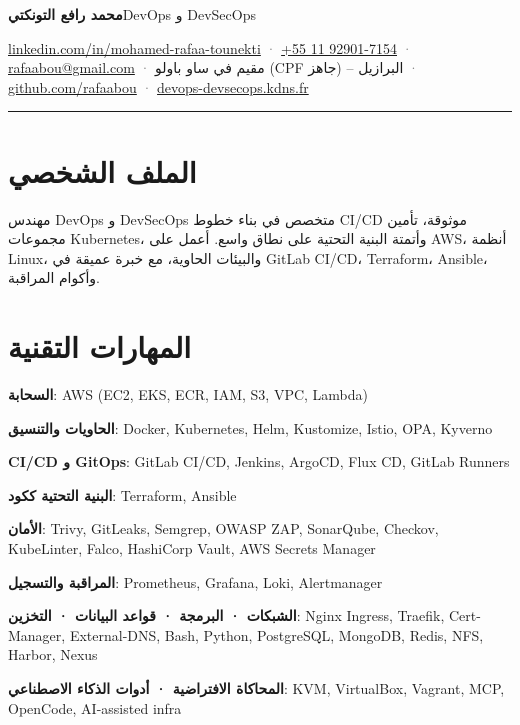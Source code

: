 \documentclass[10pt,a4paper]{article}
\begin{document}
{\LARGE\bfseries محمد رافع التونكتي}\hfill{\small DevOps و DevSecOps}\par
\vspace{3pt}
{\footnotesize \href{https://linkedin.com/in/mohamed-rafaa-tounekti}{linkedin.com/in/mohamed-rafaa-tounekti} \textcolor{graytext}{·} \href{tel:+5511929017154}{+55 11 92901-7154} \textcolor{graytext}{·} \href{mailto:rafaabou@gmail.com}{rafaabou@gmail.com} \textcolor{graytext}{·} مقيم في ساو باولو (CPF جاهز) – البرازيل \textcolor{graytext}{·} \href{https://github.com/rafaabou}{github.com/rafaabou} \textcolor{graytext}{·} \href{https://devops-devsecops.kdns.fr/}{devops-devsecops.kdns.fr}}\par
\vspace{2pt}\hrule\vspace{2pt}
\section*{الملف الشخصي}
مهندس DevOps و DevSecOps متخصص في بناء خطوط CI/CD موثوقة، تأمين مجموعات Kubernetes، وأتمتة البنية التحتية على نطاق واسع. أعمل على AWS، أنظمة Linux، والبيئات الحاوية، مع خبرة عميقة في GitLab CI/CD، Terraform، Ansible، وأكوام المراقبة.\par
\section*{المهارات التقنية}
\textbf{السحابة}: AWS (EC2, EKS, ECR, IAM, S3, VPC, Lambda)\par
\textbf{الحاويات والتنسيق}: Docker, Kubernetes, Helm, Kustomize, Istio, OPA, Kyverno\par
\textbf{CI/CD و GitOps}: GitLab CI/CD, Jenkins, ArgoCD, Flux CD, GitLab Runners\par
\textbf{البنية التحتية ككود}: Terraform, Ansible\par
\textbf{الأمان}: Trivy, GitLeaks, Semgrep, OWASP ZAP, SonarQube, Checkov, KubeLinter, Falco, HashiCorp Vault, AWS Secrets Manager\par
\textbf{المراقبة والتسجيل}: Prometheus, Grafana, Loki, Alertmanager\par
\textbf{الشبكات · البرمجة · قواعد البيانات · التخزين}: Nginx Ingress, Traefik, Cert-Manager, External-DNS, Bash, Python, PostgreSQL, MongoDB, Redis, NFS, Harbor, Nexus\par
\textbf{المحاكاة الافتراضية · أدوات الذكاء الاصطناعي}: KVM, VirtualBox, Vagrant, MCP, OpenCode, AI-assisted infra\par
\end{document}

